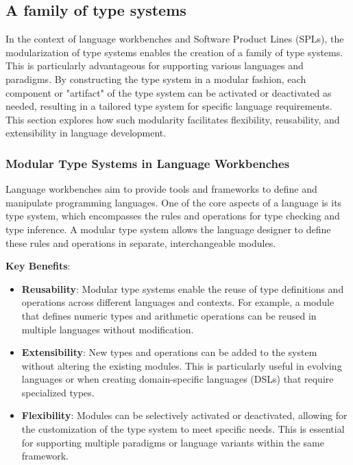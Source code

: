 \subsection{A family of type systems}\label{subsec:concept:AFamilyOfTypeSystems}
In the context of language workbenches and Software Product Lines (SPLs), the modularization of type systems enables the creation of a family of type systems. This is particularly advantageous for supporting various languages and paradigms. By constructing the type system in a modular fashion, each component or "artifact" of the type system can be activated or deactivated as needed, resulting in a tailored type system for specific language requirements. This section explores how such modularity facilitates flexibility, reusability, and extensibility in language development.

\subsubsection{Modular Type Systems in Language Workbenches}

Language workbenches aim to provide tools and frameworks to define and manipulate programming languages. One of the core aspects of a language is its type system, which encompasses the rules and operations for type checking and type inference. A modular type system allows the language designer to define these rules and operations in separate, interchangeable modules.

\noindent \textbf{Key Benefits}:
\begin{itemize}
    \item \textbf{Reusability}: Modular type systems enable the reuse of type definitions and operations across different languages and contexts. For example, a module that defines numeric types and arithmetic operations can be reused in multiple languages without modification.
    \item \textbf{Extensibility}: New types and operations can be added to the system without altering the existing modules. This is particularly useful in evolving languages or when creating domain-specific languages (DSLs) that require specialized types.
    \item\textbf{ Flexibility}: Modules can be selectively activated or deactivated, allowing for the customization of the type system to meet specific needs. This is essential for supporting multiple paradigms or language variants within the same framework.
\end{itemize}

